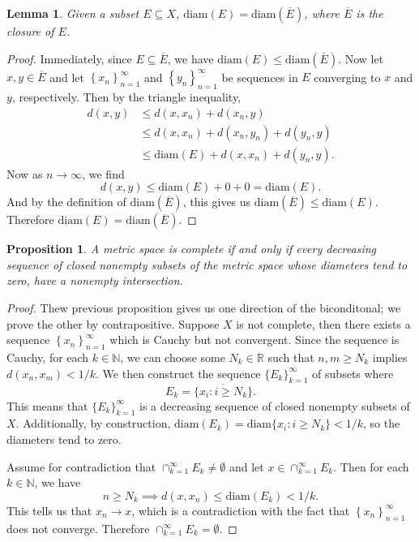 \documentclass[12pt]{article}
\newcommand{\N}{\mathbb{N}}
\newcommand{\R}{\mathbb{R}}
\newcommand{\diam}{\text{diam}}
\newtheorem{lemma}{Lemma}
\newtheorem{proposition}{Proposition}
\newcommand{\seq}[1]{\left\{#1\right\}_{n=1}^\infty}
\begin{document}
\begin{lemma}
    Given a subset $E\subseteq X$, $\diam(E) = \diam(\overline{E})$, where $\overline{E}$ is the closure of $E$.    
\end{lemma}

\begin{proof}
    Immediately, since $E\subseteq \overline{E}$, we have $\diam(E)\leq\diam(\overline{E})$. Now let $x,y\in\overline{E}$ and let $\seq{x_n}$ and $\seq{y_n}$ be sequences in $E$ converging to $x$ and $y$, respectively. Then by the triangle inequality,
    \begin{align*}
        d(x,y) 
            &\leq d(x,x_n) + d(x_n,y) \\
            &\leq d(x,x_n) + d(x_n,y_n) + d(y_n,y) \\
            &\leq \diam(E) + d(x,x_n) + d(y_n,y).
    \end{align*}
    Now as $n\to\infty$, we find
    \[d(x,y) \leq \diam(E) + 0 + 0 = \diam(E).\]
    And by the definition of $\diam(\overline{E})$, this gives us $\diam(\overline{E}) \leq \diam(E)$. Therefore $\diam(E) = \diam(\overline{E})$.
    
    
\end{proof}

\begin{proposition}
    A metric space is complete if and only if every decreasing sequence of closed nonempty subsets of the metric space whose diameters tend to zero, have a nonempty intersection.
\end{proposition}

\begin{proof}
    Thew previous proposition gives us one direction of the biconditonal; we prove the other by contrapositive. Suppose $X$ is not complete, then there exists a sequence $\seq{x_n}$ which is Cauchy but not convergent. Since the sequence is Cauchy, for each $k\in\N$, we can choose some $N_k\in\R$ such that $n,m\geq N_k$ implies $d(x_n,x_m)<1/k$. We then construct the sequence $\{E_k\}_{k=1}^\infty$ of subsets where
    \[E_k = \overline{\{x_i : i \geq N_k\}}.\]
    This means that $\{E_k\}_{k=1}^\infty$ is a decreasing sequence of closed nonempty subsets of $X$. Additionally, by construction, $\diam(E_k) = \diam\{x_i : i \geq N_k\}  < 1/k$, so the diameters tend to zero.
    
    Assume for contradiction that $\cap_{k=1}^\infty E_k \ne \emptyset$ and let $x\in\cap_{k=1}^\infty E_k$. Then for each $k\in\N$, we have
    \[n\geq N_k \implies d(x,x_n) \leq \diam(E_k) < 1/k.\]
    This tells us that $x_n\to x$, which is a contradiction with the fact that $\seq{x_n}$ does not converge. Therefore $\cap_{k=1}^\infty E_k = \emptyset$.
    
\end{proof}
\end{document}
